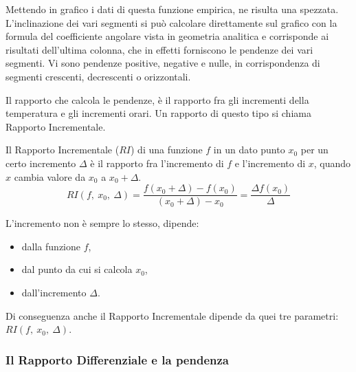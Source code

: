 \begin{esempio}
Mettendo in grafico i dati di questa funzione empirica, ne risulta una 
spezzata. 
L'inclinazione dei vari segmenti si può calcolare direttamente sul 
grafico con la formula del coefficiente angolare vista in geometria 
analitica e corrisponde ai risultati dell'ultima colonna, 
che in effetti forniscono le pendenze dei vari segmenti. 
Vi sono pendenze positive, negative e nulle, in 
corrispondenza di segmenti crescenti, decrescenti o orizzontali. 
\end{esempio}
 
Il rapporto che calcola le pendenze, è il 
rapporto fra gli incrementi della temperatura e gli incrementi orari. 
Un rapporto di questo tipo si chiama Rapporto Incrementale.
\begin{definizione}
Il Rapporto Incrementale (\(RI\)) 
di una funzione \(f\) 
in un dato punto \(x_0\)
per un certo incremento \(\Delta\)
è il rapporto 
fra l'incremento di \(f\) e l'incremento di \(x\), quando \(x\) 
cambia valore da \(x_0\) a \(x_0+\Delta\).
\[RI(f,~x_0,~\Delta) = 
  \frac{f(x_0+\Delta)-f(x_0)}{(x_0+\Delta)- x_0}=
  \frac{\Delta f(x_0)}{\Delta}\]
\end{definizione}
L'incremento non è sempre lo stesso, dipende: 
\begin{itemize} [nosep]
\item dalla funzione \(f\), 
\item dal punto da cui si calcola \(x_0\), 
\item dall'incremento \(\Delta\).
\end{itemize}
Di conseguenza anche il Rapporto Incrementale dipende da quei tre 
parametri: \(RI(f,~x_0,~\Delta)\).

\subsubsection{Il Rapporto Differenziale e la pendenza}
\label{subsubsec:RD}

